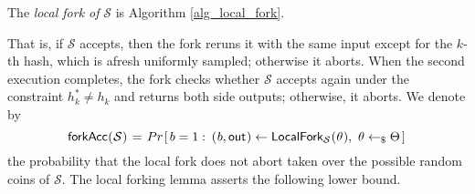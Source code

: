 \documentclass{iacrtrans}
\begin{document}
\begin{defn}\label{def_local_fork}
The \textit{local fork of} $\mathcal{S}$ is
Algorithm \ref{alg_local_fork}.
\end{defn}

\noindent
That is, if $\mathcal{S}$ accepts, then
the fork reruns it with the same input except
for the $k$-th hash, which is
afresh uniformly sampled; otherwise it aborts.
When the second execution completes, the fork checks
whether $\mathcal{S}$ accepts again under the constraint
$h_k^* \neq h_k$ and returns both side outputs;
otherwise, it aborts. We denote by
\vspace{5pt}
\begin{equation}\label{local_forking_forkacc}
\mathsf{forkAcc}
\hspace{0.3pt}
(
	\hspace{0.3pt}
	\mathcal{S}
	\hspace{0.3pt}
)
\hspace{1pt}
=
\hspace{1pt}
Pr\hspace{1pt}[\hspace{1.5pt}b = 1 :
\hspace{2pt}(
	\hspace{0.5pt}
	b,
	\mathsf{out}
	\hspace{0.5pt}
)
\leftarrow
\mathsf{LocalFork}_{\mathcal{S}}
	\hspace{0.3pt}(
	\hspace{0.3pt}
	\theta
	\hspace{0.3pt}
),
\ \theta \leftarrow_\$ \Theta
\hspace{1.5pt}]\hspace{1pt}
\vspace{8pt}
\end{equation}
the probability that the local fork does not abort
taken over the possible random coins of $\mathcal{S}$.
The local forking lemma asserts the following lower bound.
\end{document}
